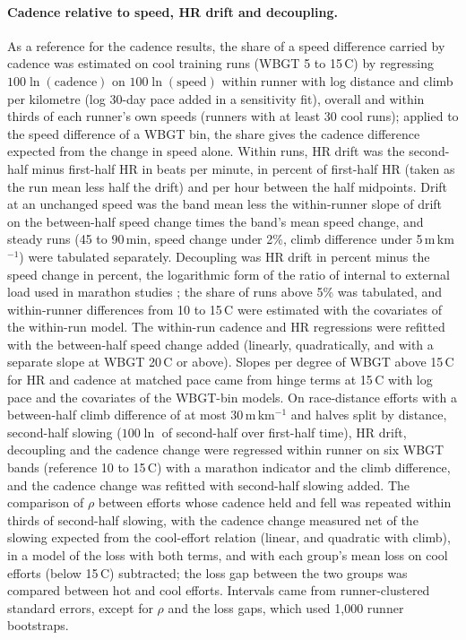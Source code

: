 \documentclass[12pt]{article}
\newcommand{\degC}{\,\textdegree C}
\begin{document}
\paragraph{Cadence relative to speed, HR drift and decoupling.} As a reference for the cadence results, the share of a speed difference carried by cadence was estimated on cool training runs (WBGT 5 to 15\degC) by regressing $100 \ln(\text{cadence})$ on $100 \ln(\text{speed})$ within runner with log distance and climb per kilometre (log 30-day pace added in a sensitivity fit), overall and within thirds of each runner's own speeds (runners with at least 30 cool runs); applied to the speed difference of a WBGT bin, the share gives the cadence difference expected from the change in speed alone. Within runs, HR drift was the second-half minus first-half HR in beats per minute, in percent of first-half HR (taken as the run mean less half the drift) and per hour between the half midpoints. Drift at an unchanged speed was the band mean less the within-runner slope of drift on the between-half speed change times the band's mean speed change, and steady runs (45 to 90\,min, speed change under 2\%, climb difference under 5\,m\,km$^{-1}$) were tabulated separately. Decoupling was HR drift in percent minus the speed change in percent, the logarithmic form of the ratio of internal to external load used in marathon studies \cite{smyth2022}; the share of runs above 5\% was tabulated, and within-runner differences from 10 to 15\degC{} were estimated with the covariates of the within-run model. The within-run cadence and HR regressions were refitted with the between-half speed change added (linearly, quadratically, and with a separate slope at WBGT 20\degC{} or above). Slopes per degree of WBGT above 15\degC{} for HR and cadence at matched pace came from hinge terms at 15\degC{} with log pace and the covariates of the WBGT-bin models. On race-distance efforts with a between-half climb difference of at most 30\,m\,km$^{-1}$ and halves split by distance, second-half slowing ($100 \ln$ of second-half over first-half time), HR drift, decoupling and the cadence change were regressed within runner on six WBGT bands (reference 10 to 15\degC) with a marathon indicator and the climb difference, and the cadence change was refitted with second-half slowing added. The comparison of $\rho$ between efforts whose cadence held and fell was repeated within thirds of second-half slowing, with the cadence change measured net of the slowing expected from the cool-effort relation (linear, and quadratic with climb), in a model of the loss with both terms, and with each group's mean loss on cool efforts (below 15\degC) subtracted; the loss gap between the two groups was compared between hot and cool efforts. Intervals came from runner-clustered standard errors, except for $\rho$ and the loss gaps, which used 1,000 runner bootstraps.
\end{document}
